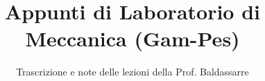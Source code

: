 \documentclass[a4paper,12pt]{article}
\title{Appunti di Laboratorio di Meccanica (Gam-Pes)}
\author{Trascrizione e note delle lezioni della Prof. Baldassarre}
\date{}
\begin{document}
\maketitle
\projectintro
\tableofcontents
\newpage

\end{document}
